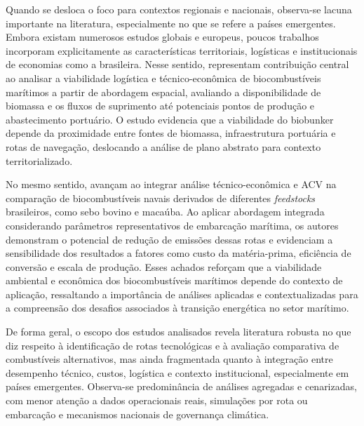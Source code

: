 Quando se desloca o foco para contextos regionais e nacionais, observa-se lacuna importante na literatura, especialmente no que se refere a países emergentes. Embora existam numerosos estudos globais e europeus, poucos trabalhos incorporam explicitamente as características territoriais, logísticas e institucionais de economias como a brasileira. Nesse sentido, \citet{carvalho_biofuels_2021} representam contribuição central ao analisar a viabilidade logística e técnico-econômica de biocombustíveis marítimos a partir de abordagem espacial, avaliando a disponibilidade de biomassa e os fluxos de suprimento até potenciais pontos de produção e abastecimento portuário. O estudo evidencia que a viabilidade do biobunker depende da proximidade entre fontes de biomassa, infraestrutura portuária e rotas de navegação, deslocando a análise de plano abstrato para contexto territorializado.

No mesmo sentido, \citet{cesilla_de_souza_technical-economic_2024} avançam ao integrar análise técnico-econômica e \gls{ACV} na comparação de biocombustíveis navais derivados de diferentes \emph{feedstocks} brasileiros, como sebo bovino e macaúba. Ao aplicar abordagem integrada considerando parâmetros representativos de embarcação marítima, os autores demonstram o potencial de redução de emissões dessas rotas e evidenciam a sensibilidade dos resultados a fatores como custo da matéria-prima, eficiência de conversão e escala de produção. Esses achados reforçam que a viabilidade ambiental e econômica dos biocombustíveis marítimos depende do contexto de aplicação, ressaltando a importância de análises aplicadas e contextualizadas para a compreensão dos desafios associados à transição energética no setor marítimo.

De forma geral, o escopo dos estudos analisados revela literatura robusta no que diz respeito à identificação de rotas tecnológicas e à avaliação comparativa de combustíveis alternativos, mas ainda fragmentada quanto à integração entre desempenho técnico, custos, logística e contexto institucional, especialmente em países emergentes. Observa-se predominância de análises agregadas e cenarizadas, com menor atenção a dados operacionais reais, simulações por rota ou embarcação e mecanismos nacionais de governança climática.

